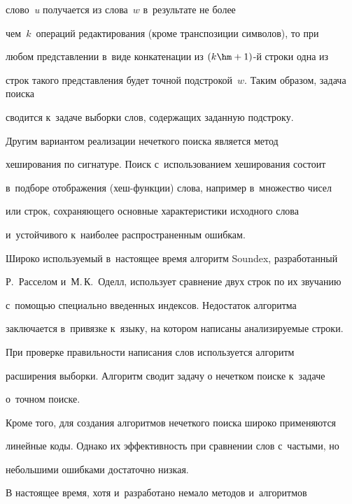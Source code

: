 слово~\textit{u} получается из слова~$w$ в~результате не более 


чем~$k$~операций редактирования (кроме транспозиции символов), то при 


любом представлении в~виде конкатенации из $(k\hm+1)$-й строки одна из 


строк такого представления будет точной подстрокой~$w$. Таким образом, задача поиска 


сводится к~задаче выборки слов, содержащих заданную подстроку. 


  


  Другим вариантом реализации нечеткого поиска является метод 


хеширования по сигнатуре. Поиск с~использованием хеширования состоит 


в~подборе отображения (хеш-функ\-ции) слова, например в~множество чисел 


или строк, сохраняющего основные характеристики исходного слова 


и~устойчивого к~наиболее распространенным ошибкам. 


  


  Широко используемый в~настоящее время алгоритм Soundex, разработанный 


Р.~Расселом и~М.\,К.~Оделл, использует сравнение двух строк по их звучанию 


с~по\-мощью специально введенных индексов. Недостаток алгоритма 


заключается в~привязке к~языку, на котором написаны анализируемые строки. 


  


  При проверке правильности написания слов используется алгоритм 


расширения выборки. Алгоритм сводит задачу о нечетком поиске к~задаче 


о~точном поиске. 


  


  Кроме того, для создания алгоритмов нечеткого поиска широко применяются 


линейные коды. Однако их эффективность при сравнении слов с~частыми, но 


небольшими ошибками достаточно низкая. 


  


  В настоящее время, хотя и~разработано немало методов и~алгоритмов 



